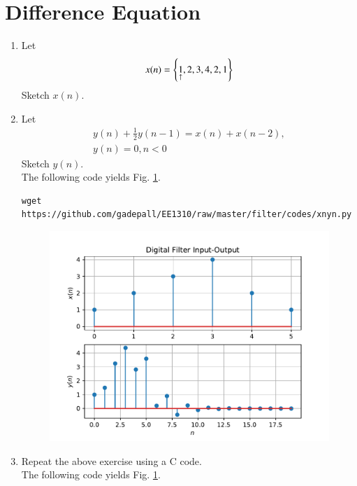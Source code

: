 \documentclass[journal,12pt,twocolumn]{IEEEtran}
\renewcommand\thesection{\arabic{section}}
\begin{document}
\section{Difference Equation}
\begin{enumerate}[label=\thesection.\arabic*,ref=\thesection.\theenumi]
\item Let
\label{def:xn}
\begin{equation}
x(n) = \left\{\underset{\uparrow}{1},2,3,4,2,1\right\}
\end{equation}
Sketch $x(n)$.
\item Let
\begin{multline}
\label{eq:iir_filter}
y(n) + \frac{1}{2}y(n-1) = x(n) + x(n-2), 
\\
 y(n) = 0, n < 0
\end{multline}
Sketch $y(n)$.
\\
\solution The following code yields Fig. \ref{fig:xnyn}.
\begin{lstlisting}
wget https://github.com/gadepall/EE1310/raw/master/filter/codes/xnyn.py
\end{lstlisting}
% 
\begin{figure}[!ht]
\begin{center}
\includegraphics[width=\columnwidth]{./figs/xnyn}
\end{center}
\label{fig:xnyn}	
\end{figure}
\item Repeat the above exercise using a C code.
\\
\solution The following code yields Fig. \ref{fig:xnyn}.
\begin{lstlisting}

\end{lstlisting}
\end{enumerate}
\end{document}
